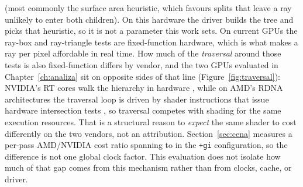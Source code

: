 (most commonly the surface area heuristic, which favours splits that leave a ray unlikely to enter
both children). On this hardware the driver builds the tree and picks that heuristic, so it is not a
parameter this work sets. On current GPUs the ray-box and ray-triangle
tests are fixed-function hardware, which is what makes a ray per pixel affordable in real time. How
much of the \emph{traversal} around those tests is also fixed-function differs by vendor, and the two
GPUs evaluated in Chapter~\ref{ch:analiza} sit on opposite sides of that line
(Figure~\ref{fig:traversal}): NVIDIA's RT cores walk the hierarchy in hardware \cite{nvidia_turing},
while on AMD's RDNA architectures the traversal loop is driven by shader instructions that issue
hardware intersection tests \cite{amd_rdna_isa}, so traversal competes with shading for the same
execution resources. That is a structural reason to \emph{expect} the same shader to cost differently
on the two vendors, not an attribution. Section~\ref{sec:cena} measures a per-pass AMD/NVIDIA cost
ratio spanning \perfRatioMin{} to \perfRatioMax{} in the \texttt{+gi} configuration, so the
difference is not one global
clock factor. This evaluation does not isolate how much of that gap comes from this mechanism rather
than from clocks, cache, or driver.

